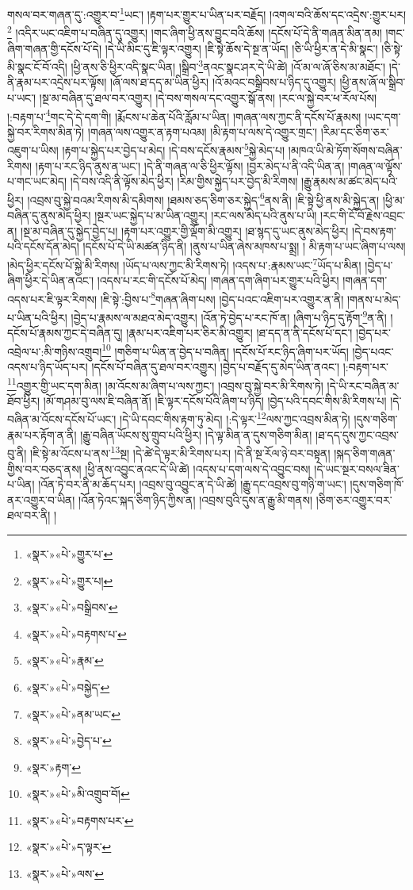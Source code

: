 གསལ་བར་གཞན་དུ་:འགྱུར་བ་\footnote{«སྣར་»«པེ་»གྱུར་པ་}ཡང་། །རྟག་པར་གྱུར་པ་ཡིན་པར་བརྗོད། །འགལ་བའི་ཆོས་དང་འདྲེས་:གྱུར་པར།\footnote{«སྣར་»«པེ་»གྱུར་པ།} །འདིར་ཡང་འཇིག་པ་བཞིན་དུ་འགྱུར། །གང་ཞིག་ཕྱི་ནས་བྱུང་བའི་ཆོས། །དངོས་པོ་དེ་ནི་གཞན་མིན་ནམ། །གང་ཞིག་གཞན་གྱི་དངོས་པོ་དེ། །དེ་ཡི་མིང་དུ་ཇི་ལྟར་འགྱུར། །ཇི་སྟེ་ཆོས་དེ་སྔ་ན་ཡོད། །ཅི་ཡི་ཕྱིར་ན་དེ་མི་སྣང་། །ཅི་སྟེ་མི་སྣང་ངོ་བོ་འདི། །ཕྱི་ནས་ཅི་ཕྱིར་འདི་སྣང་ཡིན། །སྒྲིབ་\footnote{«སྣར་»«པེ་»བསྒྲིབས་}ནའང་སྣང་ཤར་དེ་ཡི་ཚེ། །འོ་མ་ལ་ཞོ་ཅིས་མ་མཐོང་། །དེ་ནི་རྣམ་པར་འདྲེས་པར་ལྟོས། །ཞོ་ལས་ཐ་དད་མ་ཡིན་ཕྱིར། །འོ་མའང་བསྒྲིབས་པ་ཉིད་དུ་འགྱུར། །ཕྱི་ནས་ཞོ་ལ་སྒྲིབ་པ་ཡང་། །སྔ་མ་བཞིན་དུ་ཐལ་བར་འགྱུར། །དེ་བས་གསལ་དང་འགྱུར་སྒོ་ནས། །རང་ལ་སྐྱེ་བར་ཕ་རོལ་པོས། །:བརྟག་པ་\footnote{«སྣར་»«པེ་»བརྟགས་པ་}གང་དེ་དེ་དག་གི། །རྨོངས་པ་ཆེན་པོའི་རློམ་པ་ཡིན། །གཞན་ལས་ཀྱང་ནི་དངོས་པོ་རྣམས། །ཡང་དག་སྐྱེ་བར་རིགས་མིན་ཏེ། །གཞན་ལས་འགྱུར་ན་རྟག་པའམ། །མི་རྟག་པ་ལས་དེ་འགྱུར་གྲང་། །རིམ་དང་ཅིག་ཅར་འཇུག་པ་ཡིས། །རྟག་པ་སྐྱེད་པར་བྱེད་པ་མེད། །དེ་བས་དངོས་རྣམས་\footnote{«སྣར་»«པེ་»རྣམ་}སྐྱེ་མེད་པ། །མཁའ་ཡི་མེ་ཏོག་སོགས་བཞིན་རིགས། །རྟག་པ་རང་ཉིད་ནུས་ན་ཡང་། །དེ་ནི་གཞན་ལ་ཅི་ཕྱིར་ལྟོས། །བྱར་མེད་པ་ནི་འདི་ཡིན་ན། །གཞན་ལ་ལྟོས་པ་གང་ཡང་མེད། །དེ་བས་འདི་ནི་ལྟོས་མེད་ཕྱིར། །རིམ་གྱིས་སྐྱེད་པར་བྱེད་མི་རིགས། །རྒྱུ་རྣམས་མ་ཚང་མེད་པའི་ཕྱིར། །འབྲས་བུ་སྐྱེ་བའམ་རིགས་མི་དམིགས། །ཐམས་ཅད་ཅིག་ཅར་སྐྱེད་\footnote{«སྣར་»«པེ་»བསྐྱེད་}ནས་ནི། །ཇི་སྟེ་ཕྱི་ནས་མི་སྐྱེད་ན། །ཕྱི་མ་བཞིན་དུ་ནུས་མེད་ཕྱིར། །སྔར་ཡང་སྐྱེད་པ་མ་ཡིན་འགྱུར། །རང་ལས་མེད་པའི་ནུས་པ་ཡི། །རང་གི་ངོ་བོ་རྗེས་འབྲང་ན། །སྔ་མ་བཞིན་དུ་སྐྱེད་བྱེད་པ། །རྟག་པར་འགྱུར་གྱི་ལྡོག་མི་འགྱུར། །ཐ་སྙད་དུ་ཡང་ནུས་མེད་ཕྱིར། །དེ་བས་རྟག་པའི་དངོས་དོན་མེད། །དངོས་པོ་དེ་ཡི་མཚན་ཉིད་ནི། །ནུས་པ་ཡིན་ཞེས་མཁས་པ་སྨྲ། །
མི་རྟག་པ་ཡང་ཞིག་པ་ལས། །མེད་ཕྱིར་དངོས་པོ་སྐྱེ་མི་རིགས། །ཡོད་པ་ལས་ཀྱང་མི་རིགས་ཏེ། །འདས་པ་:རྣམས་ཡང་\footnote{«སྣར་»«པེ་»ནམ་ཡང་}ཡོད་པ་མིན། །བྱེད་པ་ཞིག་ཕྱིར་དེ་ཡིན་ནའང་། །འདས་པ་རང་གི་དངོས་པོ་མེད། །གཞན་དག་ཞིག་པར་གྱུར་པའི་ཕྱིར། །གཞན་དག་འདས་པར་ཇི་ལྟར་རིགས། །ཇི་སྟེ་:བྱིས་པ་\footnote{«སྣར་»«པེ་»བྱེད་པ་}གཞན་ཞིག་པས། །བྱེད་པའང་འཇིག་པར་འགྱུར་ན་ནི། །གནས་པ་མེད་པ་ཡིན་པའི་ཕྱིར། །བྱེད་པ་རྣམས་ལ་མཐའ་མེད་འགྱུར། །འོན་ཏེ་བྱེད་པ་རང་ཁོ་ན། །ཞིག་པ་ཉིད་དུ་རྟོག་\footnote{«སྣར་»རྟག་}ན་ནི། །དངོས་པོ་རྣམས་ཀྱང་དེ་བཞིན་དུ། །རྣམ་པར་འཇིག་པར་ཅིར་མི་འགྱུར། །ཐ་དད་ན་ནི་དངོས་པོ་དང་། །བྱེད་པར་འབྲེལ་པ་:མི་གཉིས་འགྲུབ།\footnote{«སྣར་»«པེ་»མི་འགྲུབ་བོ།} །གཅིག་པ་ཡིན་ན་བྱེད་པ་བཞིན། །དངོས་པོ་རང་ཉིད་ཞིག་པར་ཡོད། །བྱེད་པའང་འདས་པ་ཉིད་ཡོད་པར། །དངོས་པོ་བཞིན་དུ་ཐལ་བར་འགྱུར། །བྱེད་པ་བརྗོད་དུ་མེད་ཡིན་ནའང་། །:བརྟག་པར་\footnote{«སྣར་»«པེ་»བརྟགས་པར་}འགྱུར་གྱི་ཡང་དག་མིན། །མ་འོངས་མ་ཞིག་པ་ལས་ཀྱང་། །འབྲས་བུ་སྐྱེ་བར་མི་རིགས་ཏེ། །དེ་ཡི་རང་བཞིན་མ་ཐོབ་ཕྱིར། །མོ་གཤམ་བུ་ལས་ཇི་བཞིན་ནོ། །ཇི་ལྟར་དངོས་པོའི་ཞིག་པ་ཉིད། །བྱེད་པའི་དབང་གིས་མི་རིགས་པ། །དེ་བཞིན་མ་འོངས་དངོས་པོ་ཡང་། །དེ་ཡི་དབང་གིས་རྟག་ཏུ་མེད། །:དེ་ལྟར་\footnote{«སྣར་»«པེ་»ད་ལྟར་}ལས་ཀྱང་འབྲས་མིན་ཏེ། །དུས་གཅིག་རྣམ་པར་རྟོག་ན་ནི། །རྒྱུ་བཞིན་ཡོངས་སུ་གྲུབ་པའི་ཕྱིར། །དེ་ལྟ་མིན་ན་དུས་གཅིག་མིན། །ཐ་དད་དུས་ཀྱང་འབྲས་བུ་ནི། །ཇི་སྟེ་མ་འོངས་པ་ནས་\footnote{«སྣར་»«པེ་»ལས་}སྔ། །དེ་ཚེ་དེ་ལྟར་མི་རིགས་པར། །དེ་ནི་སྔ་རོལ་ཉེ་བར་བསྟན། །སྐད་ཅིག་གཞན་གྱིས་བར་བཅད་ནས། །ཕྱི་ནས་འབྱུང་ནའང་དེ་ཡི་ཚེ། །འདས་པ་དག་ལས་དེ་འབྱུང་བས། །དེ་ཡང་སྔར་བསལ་ཟིན་པ་ཡིན། །འོན་ཏེ་བར་ནི་མ་ཆོད་པར། །འབྲས་བུ་འབྱུང་ན་དེ་ཡི་ཚེ། །རྒྱུ་དང་འབྲས་བུ་གཉི་ག་ཡང་། །དུས་གཅིག་ཁོ་ནར་འགྱུར་བ་ཡིན། །འོན་ཏེའང་སྐད་ཅིག་ཉིད་ཀྱིས་ན། །འབྲས་བུའི་དུས་ན་རྒྱུ་མི་གནས། །ཅིག་ཅར་འགྱུར་བར་ཐལ་བར་ནི། །
